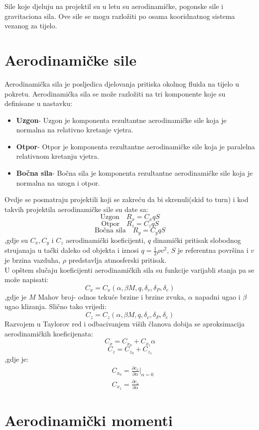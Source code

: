 
Sile koje djeluju na projektil su u letu su aerodinamičke, pogonske sile i 
gravitaciona sila. Ove sile se mogu razložiti po osama kooridnatnog sistema vezanog 
za tijelo. 
\section{Aerodinamičke sile}
Aerodinamička sila je posljedica djelovanja pritiska okolnog fluida na tijelo u pokretu. 
Aerodinamička sila se može razložiti na tri komponente koje su definisane u nastavku:
\begin{itemize}
    \item \textbf{Uzgon}- Uzgon je komponenta rezultantne aerodinamičke sile 
    koja je normalna na relativno kretanje vjetra.
    \item \textbf{Otpor}- Otpor je komponenta rezultantne aerodinamičke sile 
    koja je paralelna relativnom kretanju vjetra.
    \item \textbf{Bočna sila}- Bočna sila je komponenta rezultantne aerodinamičke sile 
    koja je normalna na uzogn i otpor. 
\end{itemize}
Ovdje se posmatraju projektili koji se zakreću da bi skrenuli(skid to turn) i 
kod takvih projektila aerodinamičke sile su date sa:
\begin{equation}
   \text{Uzgon} \quad R_x=C_xqS
\end{equation}
\begin{equation}
    \text{Otpor} \quad R_z=C_zqS
\end{equation}
\begin{equation}
    \text{Bočna sila} \quad R_y=C_yqS
\end{equation}
,gdje su $C_x,C_y$ i $C_z$ aerodinamički koeficijenti, $q$ dinamički pritisak slobodnog strujanaja
u tački daleko od objekta i iznosi $q=\frac{1}{2}\rho v^2$, $S$ je referentna površina i 
$v$ je brzina vazduha, $\rho$ predstavlja atmosferski pritisak.
\\
U opštem slučaju koeficijenti aerodinamičkih sila su funkcije varijabli stanja pa se može
napisati:
\begin{equation}
    C_x=C_x(\alpha ,\beta M,q,\delta_v,\delta_P,\delta_e)
\end{equation}
,gdje je $M$ Mahov broj- odnos tekuće brzine i brzine zvuka, $\alpha$ napadni ugao i 
$\beta$ ugao klizanja. Slično tako vrijedi:
\begin{equation}
    C_z=C_z(\alpha ,\beta M,q,\delta_v,\delta_P,\delta_e)
\end{equation}
Razvojem u Taylorov red i odbacivanjem viših članova dobija se aproksimacija 
aerodinamičkih koeficijenata:
\begin{equation}
    C_x=C_{x_0} + C_{x_1}\alpha
\end{equation}
\begin{equation}
    C_z=C_{z_0} + C_{z_1}
\end{equation}
,gdje je: 
\begin{align*}
   & C_{x_0}=\frac{\partial c_x}{\partial \alpha}|_{\alpha=0}\\ 
   & C_{x_1}=\frac{\partial c_x}{\partial \alpha}   
\end{align*}

\section{Aerodinamički momenti}
